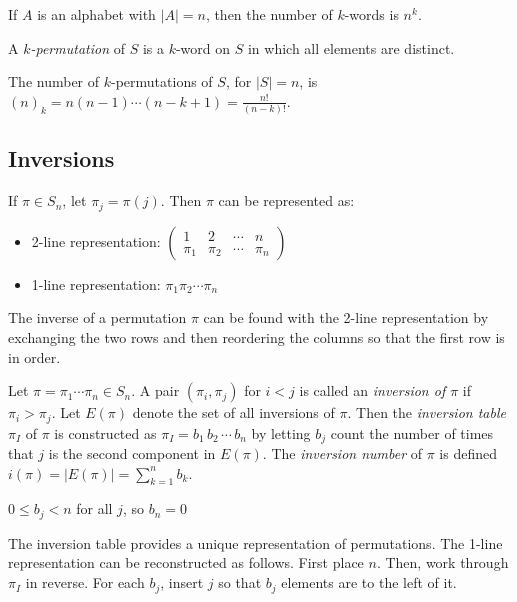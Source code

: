 \documentclass[a4paper]{article}
\begin{document}
\begin{theorem}
If $A$ is an alphabet with $|A|=n$, then the number of $k$-words is $n^k$.
\end{theorem}

\begin{definition}
A \emph{$k$-permutation} of $S$ is a $k$-word on $S$ in which all elements are distinct.
\end{definition}

\begin{theorem}
The number of $k$-permutations of $S$, for $|S|=n$, is $(n)_k=n(n-1)\cdots(n-k+1)=\frac{n!}{(n-k)!}$.
\end{theorem}

\subsection{Inversions}

\begin{definition}
If $\pi\in S_n$, let $\pi_j=\pi(j)$. Then $\pi$ can be represented as:
\begin{itemize}
\item 2-line representation: $\displaystyle\begin{pmatrix}1&2&\cdots&n\\\pi_1&\pi_2&\cdots&\pi_n\end{pmatrix}$
\item 1-line representation: $\pi_1\pi_2\cdots\pi_n$
\end{itemize}
\end{definition}

\begin{concept}
The inverse of a permutation $\pi$ can be found with the 2-line representation by exchanging the two rows and then reordering the columns so that the first row is in order.
\end{concept}

\begin{definition}
Let $\pi=\pi_1\cdots\pi_n\in S_n$. A pair $(\pi_i,\pi_j)$ for $i<j$ is called an \emph{inversion of $\pi$} if $\pi_i>\pi_j$. Let $E(\pi)$ denote the set of all inversions of $\pi$. Then the \emph{inversion table} $\pi_I$ of $\pi$ is constructed as $\pi_I=b_1\,b_2\,\cdots\,b_n$ by letting $b_j$ count the number of times that $j$ is the second component in $E(\pi)$. The \emph{inversion number} of $\pi$ is defined $i(\pi)=|E(\pi)|=\sum_{k=1}^nb_k$.
\begin{arrows}
\item $0\leq b_j<n$ for all $j$, so $b_n=0$
\item The inversion table provides a unique representation of permutations. The 1-line representation can be reconstructed as follows. First place $n$. Then, work through $\pi_I$ in reverse. For each $b_j$, insert $j$ so that $b_j$ elements are to the left of it.
\end{arrows}
\end{definition}
\end{document}
